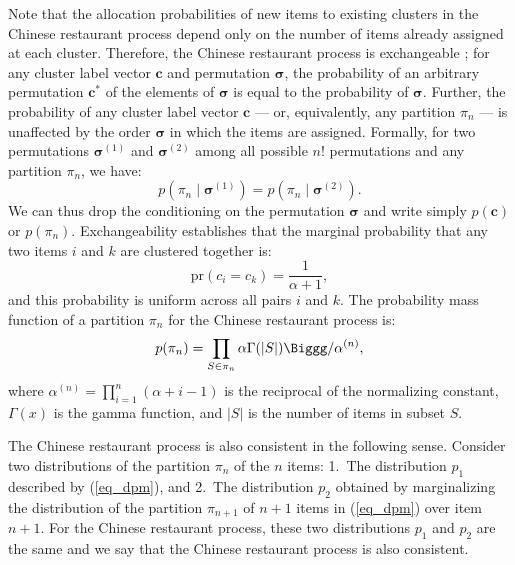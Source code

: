 \documentclass[lineno]{biometrika-dbd}
\newcommand{\partition}{\ensuremath{\pi}}
\newcommand{\mass}{\alpha}
\newcommand{\given}{\mid}
\newcommand{\sizeof}[1]{| #1 |}
\begin{document}
Note that the allocation probabilities of new items to existing clusters in the
Chinese restaurant process depend only on the number of items already assigned
at each cluster.  Therefore, the Chinese restaurant process is exchangeable
\citep{pitm:1995}; for any cluster label vector $\bm{c}$ and permutation
$\bm{\sigma}$, the probability of an arbitrary permutation $\bm{c}^\ast$ of the
elements of $\bm{\sigma}$ is equal to the probability of $\bm{\sigma}$.
Further, the probability of any cluster label vector $\bm{c}$ --- or,
equivalently, any partition $\partition_n$ --- is unaffected by the order
$\bm{\sigma}$ in which the items are assigned.  Formally, for two permutations
$\bm{\sigma}^{(1)}$ and $\bm{\sigma}^{(2)}$ among all possible $n!$
permutations and any partition $\partition_n$, we have:
\begin{equation}
\label{eq_permutation_invariance}
p(\partition_n \given \bm{\sigma}^{(1)}) = p(\partition_n \given \bm{\sigma}^{(2)}).
\end{equation}
We can thus drop the conditioning on the permutation $\bm{\sigma}$ and write
simply $p(\bm{c})$ or $p(\partition_n)$.  Exchangeability establishes that the
marginal probability that any two items $i$ and $k$ are clustered together is:
\begin{equation}
\label{eq_uniform}
\text{pr}(c_i = c_k ) = \frac{1}{\mass+1},
\end{equation}
and this probability is uniform across all pairs $i$ and $k$.  The probability
mass function of a partition $\partition_n$ for the Chinese restaurant process
is:
\begin{equation}
\label{eq_dpm}
p(\partition_n) = \prod_{S \in \partition_n} \mass \Gamma(\sizeof{S}) \Biggg/ \mass^{(n)},
\end{equation}
where $\mass^{(n)} = \prod_{i=1}^n(\mass+i-1)$ is the reciprocal of the
normalizing constant, $\Gamma(x)$ is the gamma function, and $\sizeof{S}$ is
the number of items in subset $S$.

The Chinese restaurant process is also consistent in the following sense.
Consider two distributions of the partition $\partition_{n}$ of the $n$ items:
1.\ The distribution $p_1$ described by (\ref{eq_dpm}), and 2.\ The
distribution $p_2$ obtained by marginalizing the distribution of the partition
$\partition_{n+1}$ of $n+1$ items in (\ref{eq_dpm}) over item $n+1$.  For the
Chinese restaurant process, these two distributions $p_1$ and $p_2$ are the
same and we say that the Chinese restaurant process is also consistent.
\end{document}
